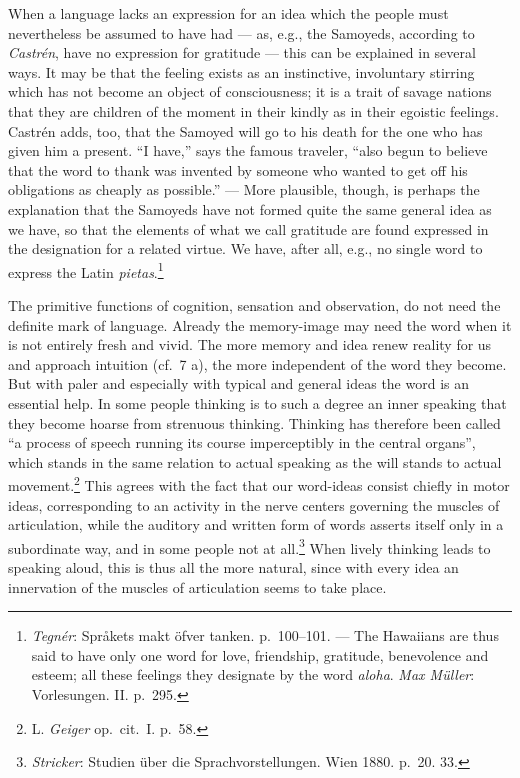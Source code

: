 \documentclass[12pt,a4paper]{book}
\newcommand{\opage}[1]{\marginnote{\footnotesize\textit{[#1]}}}
\begin{document}
When a language lacks an expression for an idea which the people must
nevertheless be assumed to have had --- as, e.g., the Samoyeds,
according to \emph{Castrén}, have no expression for gratitude --- this
can be explained in several ways. It may be that the feeling exists as
an instinctive, involuntary stirring which has not become an object of
consciousness; it is a trait of savage nations that they are children of
the moment in their kindly as in their egoistic feelings. Castrén adds,
too, that the Samoyed will go to his death for the one who has given him
a present. ``I have,'' says the famous traveler, ``also begun to believe
that the word to thank was invented by someone who wanted to get off his
obligations as cheaply as possible.'' --- More plausible, though, is
perhaps the explanation that the Samoyeds have not formed quite the same
general idea as we have, so that the elements of what we call gratitude
are found expressed in the designation for a related virtue. We have,
after all, e.g., no single word to express the Latin
\textit{pietas}.\footnote{\emph{Tegnér}: Språkets makt öfver tanken.
p.~100--101. --- The Hawaiians are thus said to have only one word for
love, friendship, gratitude, benevolence and esteem; all these feelings
they designate by the word \textit{aloha}. \emph{Max Müller}:
Vorlesungen. II. p.~295.}

The primitive functions of cognition, sensation and observation, do not
need the definite mark of language. Already
\opage{208}the memory-image may need the word when it is not entirely
fresh and vivid. The more memory and idea renew reality for us and
approach intuition (cf.\ 7 a), the more independent of the word they
become. But with paler and especially with typical and general ideas the
word is an essential help. In some people thinking is to such a degree
an inner speaking that they become hoarse from strenuous thinking.
Thinking has therefore been called ``a process of speech running its
course imperceptibly in the central organs'', which stands in the same
relation to actual speaking as the will stands to actual
movement.\footnote{L. \emph{Geiger} op.\ cit.\ I. p.~58.} This agrees
with the fact that our word-ideas consist chiefly in motor ideas,
corresponding to an activity in the nerve centers governing the muscles
of articulation, while the auditory and written form of words asserts
itself only in a subordinate way, and in some people not at
all.\footnote{\emph{Stricker}: Studien über die Sprachvorstellungen.
Wien 1880. p.~20. 33.} When lively thinking leads to speaking aloud,
this is thus all the more natural, since with every idea an innervation
of the muscles of articulation seems to take place.
\end{document}
